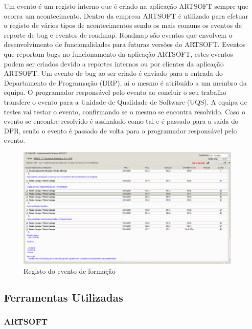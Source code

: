 \documentclass[sigplan]{acmart}
\begin{document}
Um evento é um registo interno que é criado na aplicação ARTSOFT sempre que ocorra um acontecimento. Dentro da empresa ARTSOFT é utilizado para efetuar o registo de vários tipos de acontecimentos sendo os mais comuns os eventos de reporte de bug e eventos de roadmap. Roadmap são eventos que envolvem o desenvolvimento de funcionalidades para futuras versões do ARTSOFT. Eventos que reportam bugs no funcionamento da aplicação ARTSOFT, estes eventos podem ser criados devido a reportes internos ou por clientes da aplicação ARTSOFT. Um evento de bug ao ser criado é enviado para a entrada do Departamento de Programação (DRP), aí o mesmo é atribuído a um membro da equipa. O programador responsável pelo evento ao concluir o seu trabalho transfere o evento para a Unidade de Qualidade de Software (UQS). A equipa de testes vai testar o evento, confirmando se o mesmo se encontra resolvido. Caso o evento se encontre resolvido é assinalado como tal e é passado para a saída do DPR, senão o evento é passado de volta para o programador responsável pelo evento.

\begin{figure}[htbp]
	\centerline{\includegraphics[width=\linewidth]{figures/evento_formacao.png}}
	\caption{Registo do evento de formação}
	\label{fig1}
\end{figure}

\subsection{Ferramentas Utilizadas}


\subsubsection{ARTSOFT}
\end{document}
